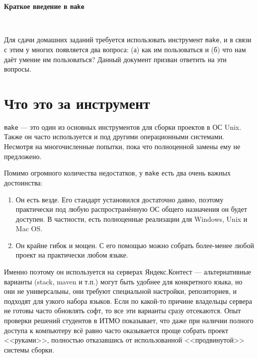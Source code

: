 \documentclass[11pt,a4paper,oneside]{article}
\begin{document}
\begin{center}
\begin{Large}{\bfseries Краткое введение в \texttt{make}}\end{Large}\\
\end{center}

Для сдачи домашних заданий требуется использовать инструмент \texttt{make}, 
и в связи с этим у многих появляется два вопроса: (а) как им пользоваться и
(б) что нам даёт умение им пользоваться? Данный документ призван ответить на
эти вопросы.

\section*{Что это за инструмент}

\texttt{make} --- это один из основных инструментов для сборки проектов в ОС
Unix. Также он часто используется и под другими операционными системами.
Несмотря на многочисленные попытки, пока что полноценной замены ему не предложено.

Помимо огромного количества недостатков, у \texttt{make} есть два очень
важных достоинства:

\begin{enumerate}
\item Он есть везде. Его стандарт установился достаточно давно, поэтому практически
под любую распространённую ОС общего назначения он будет доступен.
В частности, есть полноценные реализации для Windows, Unix и Mac OS.
\item Он крайне гибок и мощен. С его помощью можно собрать более-менее любой проект
на практически любом языке.
\end{enumerate}

Именно поэтому он используется на серверах Яндекс.Контест --- альтернативные
варианты (stack, maven и т.п.) могут быть удобнее для конкретного языка, но они
не универсальны, они требуют специальной настройки, репозиториев, и подходят
для узкого набора языков. Если по какой-то причине владельцы сервера не готовы
часто обновлять софт, то все эти варианты сразу отсекаются. Опыт проверки решений
студентов в ИТМО показывает, что даже при наличии полного доступа к компьютеру 
всё равно часто оказывается проще собрать проект <<руками>>, полностью отказавшись 
от использованной <<продвинутой>> системы сборки.
\end{document}
